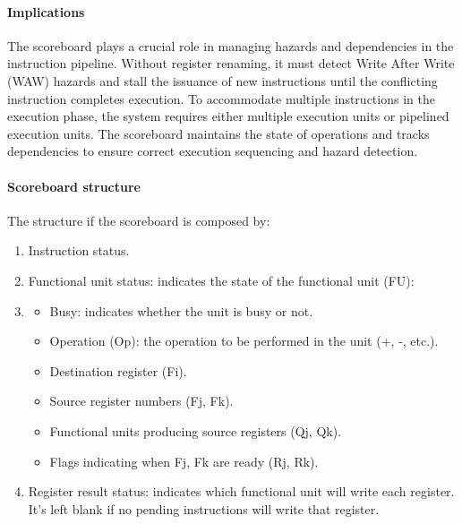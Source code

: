 \paragraph*{Implications}
The scoreboard plays a crucial role in managing hazards and dependencies in the instruction pipeline. 
Without register renaming, it must detect Write After Write (WAW) hazards and stall the issuance of new instructions until the conflicting instruction completes execution. 
To accommodate multiple instructions in the execution phase, the system requires either multiple execution units or pipelined execution units. 
The scoreboard maintains the state of operations and tracks dependencies to ensure correct execution sequencing and hazard detection.

\paragraph*{Scoreboard structure}
The structure if the scoreboard is composed by: 
\begin{enumerate}
    \item Instruction status.
    \item Functional unit status: indicates the state of the functional unit (FU):
    \item \begin{itemize}
        \item Busy: indicates whether the unit is busy or not.
        \item Operation (Op): the operation to be performed in the unit (+, -, etc.).
        \item Destination register (Fi).
        \item Source register numbers (Fj, Fk).
        \item Functional units producing source registers (Qj, Qk).
        \item Flags indicating when Fj, Fk are ready (Rj, Rk).
    \end{itemize}
    \item Register result status: indicates which functional unit will write each register. 
        It's left blank if no pending instructions will write that register.
\end{enumerate}

